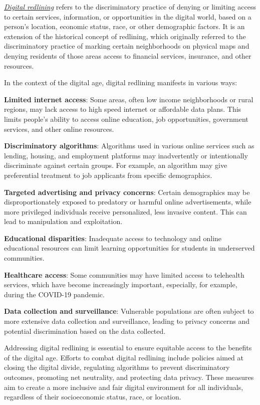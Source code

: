 \documentclass[
  letterpaper,
  DIV=11,
  numbers=noendperiod]{scrreprt}
\begin{document}
\href{https://en.wikipedia.org/wiki/Digital_redlining\#:~:text=Digital\%20redlining\%20is\%20the\%20practice,digital\%20content\%2C\%20and\%20the\%20internet.}{\emph{Digital
redlining}} refers to the discriminatory practice of denying or limiting
access to certain services, information, or opportunities in the digital
world, based on a person's location, economic status, race, or other
demographic factors. It is an extension of the historical concept of
redlining, which originally referred to the discriminatory practice of
marking certain neighborhoods on physical maps and denying residents of
those areas access to financial services, insurance, and other
resources.

In the context of the digital age, digital redlining manifests in
various ways:

\textbf{Limited internet access}: Some areas, often low income
neighborhoods or rural regions, may lack access to high speed internet
or affordable data plans. This limits people's ability to access online
education, job opportunities, government services, and other online
resources.

\textbf{Discriminatory algorithms}: Algorithms used in various online
services such as lending, housing, and employment platforms may
inadvertently or intentionally discriminate against certain groups. For
example, an algorithm may give preferential treatment to job applicants
from specific demographics.

\textbf{Targeted advertising and privacy concerns}: Certain demographics
may be disproportionately exposed to predatory or harmful online
advertisements, while more privileged individuals receive personalized,
less invasive content. This can lead to manipulation and exploitation.

\textbf{Educational disparities}: Inadequate access to technology and
online educational resources can limit learning opportunities for
students in underserved communities.

\textbf{Healthcare access}: Some communities may have limited access to
telehealth services, which have become increasingly important,
especially, for example, during the COVID-19 pandemic.

\textbf{Data collection and surveillance}: Vulnerable populations are
often subject to more extensive data collection and surveillance,
leading to privacy concerns and potential discrimination based on the
data collected.

Addressing digital redlining is essential to ensure equitable access to
the benefits of the digital age. Efforts to combat digital redlining
include policies aimed at closing the digital divide, regulating
algorithms to prevent discriminatory outcomes, promoting net neutrality,
and protecting data privacy. These measures aim to create a more
inclusive and fair digital environment for all individuals, regardless
of their socioeconomic status, race, or location.
\end{document}
